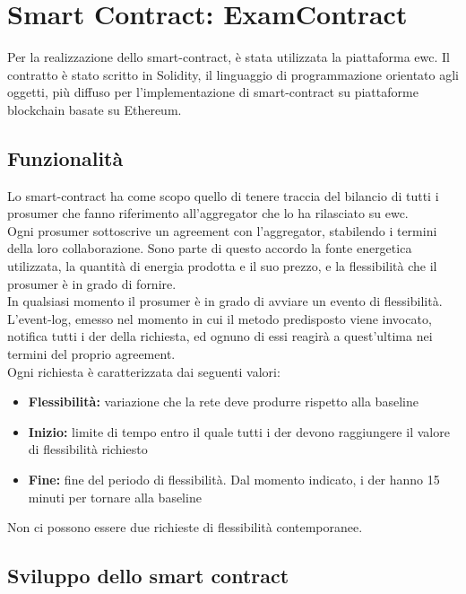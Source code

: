 \chapter{Smart Contract: ExamContract}

Per la realizzazione dello \gls{smart-contract}, è stata utilizzata la piattaforma \gls{ewc}.
Il contratto è stato scritto in Solidity, il linguaggio di programmazione orientato agli oggetti, più diffuso per l'implementazione di \gls{smart-contract} su piattaforme blockchain basate su Ethereum. \\

\section{Funzionalità}
Lo \gls{smart-contract} ha come scopo quello di tenere traccia del bilancio di tutti i \gls{prosumer} che fanno riferimento all'\gls{aggregator} che lo ha rilasciato su \gls{ewc}. \\
Ogni \gls{prosumer} sottoscrive un \gls{agreement} con l'\gls{aggregator}, stabilendo i termini della loro collaborazione.
Sono parte di questo accordo la fonte energetica utilizzata, la quantità di energia prodotta e il suo prezzo, e la flessibilità che il \gls{prosumer} è in grado di fornire. \\
In qualsiasi momento il \gls{prosumer} è in grado di avviare un evento di flessibilità.
L'\gls{event-log}, emesso nel momento in cui il metodo predisposto viene invocato, notifica tutti i \gls{der} della richiesta,
ed ognuno di essi reagirà a quest'ultima nei termini del proprio \gls{agreement}. \\
Ogni richiesta è caratterizzata dai seguenti valori:
\begin{itemize}
  \item \textbf{Flessibilità:} variazione che la rete deve produrre rispetto alla \gls{baseline}
  \item \textbf{Inizio:} limite di tempo entro il quale tutti i \gls{der} devono raggiungere il valore di flessibilità richiesto
  \item \textbf{Fine:} fine del periodo di flessibilità. Dal momento indicato, i \gls{der} hanno 15 minuti per tornare alla baseline
\end{itemize}
Non ci possono essere due richieste di flessibilità contemporanee.

\section{Sviluppo dello smart contract}

